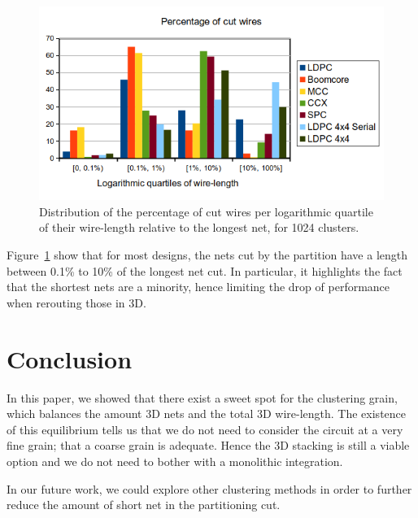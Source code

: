 \documentclass[conference]{IEEEtran}
\begin{document}
\begin{figure}[!t]
\centering
\includegraphics[width=\linewidth]{netCutWL_maxcut_all_log-quartv3.png}
\caption{Distribution of the percentage of cut wires per logarithmic quartile of their wire-length relative to the longest net, for 1024 clusters.}
\label{fig:dits-wl-quart}
\end{figure}

Figure~\ref{fig:dits-wl-quart} show that for most designs, the nets cut by the partition have a length between 0.1\% to 10\% of the longest net cut.
In particular, it highlights the fact that the shortest nets are a minority, hence limiting the drop of performance when rerouting those in 3D.



\section{Conclusion}\label{sec:concl}
In this paper, we showed that there exist a sweet spot for the clustering grain, which balances the amount 3D nets and the total 3D wire-length.
The existence of this equilibrium tells us that we do not need to consider the circuit at a very fine grain; that a coarse grain is adequate.
Hence the 3D stacking is still a viable option and we do not need to bother with a monolithic integration.

In our future work, we could explore other clustering methods in order to further reduce the amount of short net in the partitioning cut.





\end{document}
